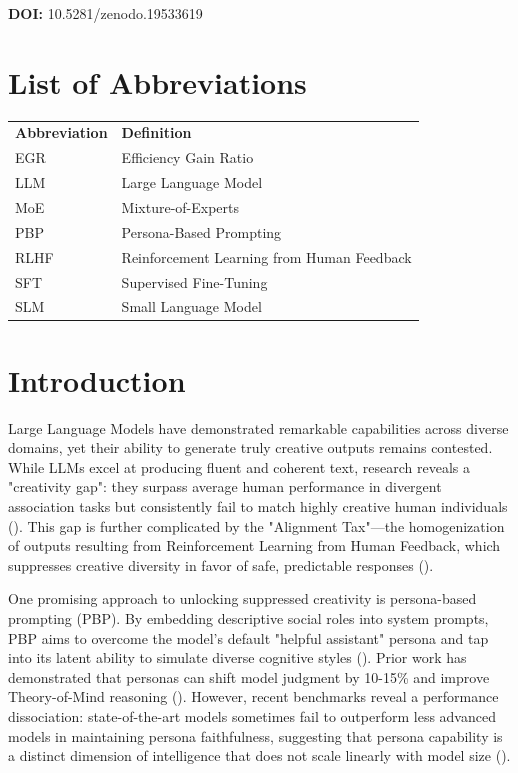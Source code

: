 \documentclass{article}
\begin{document}
\noindent\textbf{DOI:} 10.5281/zenodo.19533619
\section*{List of Abbreviations}

\begin{center}
\begin{tabular}{ll}
\textbf{Abbreviation} & \textbf{Definition} \\
EGR & Efficiency Gain Ratio \\
LLM & Large Language Model \\
MoE & Mixture-of-Experts \\
PBP & Persona-Based Prompting \\
RLHF & Reinforcement Learning from Human Feedback \\
SFT & Supervised Fine-Tuning \\
SLM & Small Language Model \\
\end{tabular}
\end{center}

\section{Introduction}

Large Language Models have demonstrated remarkable capabilities across diverse domains, yet their ability to generate truly creative outputs remains contested. While LLMs excel at producing fluent and coherent text, research reveals a "creativity gap": they surpass average human performance in divergent association tasks but consistently fail to match highly creative human individuals (\cite{ antoine_bellemare_pepin_a5621579, vikram_arora_67282d96}). This gap is further complicated by the "Alignment Tax"—the homogenization of outputs resulting from Reinforcement Learning from Human Feedback, which suppresses creative diversity in favor of safe, predictable responses (\cite{ behnam_mohammadi_78154429,michael_ryan_c7257c47}).

One promising approach to unlocking suppressed creativity is persona-based prompting (PBP). By embedding descriptive social roles into system prompts, PBP aims to overcome the model's default "helpful assistant" persona and tap into its latent ability to simulate diverse cognitive styles (\cite{christina_lu_520bd0ae,jing_yang_699d9c2c}). Prior work has demonstrated that personas can shift model judgment by 10-15\% and improve Theory-of-Mind reasoning (\cite{tiancheng_hu_49571f40,gerard_yeo_2544df62}). However, recent benchmarks reveal a performance dissociation: state-of-the-art models sometimes fail to outperform less advanced models in maintaining persona faithfulness, suggesting that persona capability is a distinct dimension of intelligence that does not scale linearly with model size (\cite{vinay_samuel_301ec4c0}).
\end{document}
